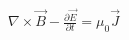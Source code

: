 \documentclass[preview]{standalone}
\begin{document}
\begin{align*}
\nabla \times \vec{B} - \frac{\partial \vec{E}}{\partial t} = \mu_0\vec{J}
\end{align*}
\end{document}
